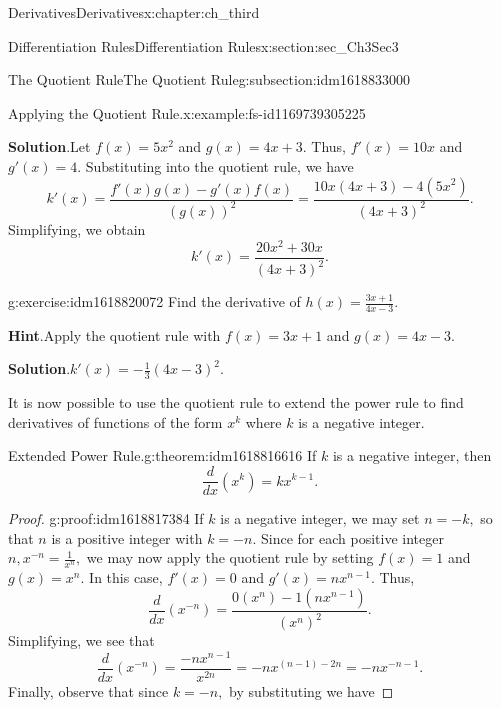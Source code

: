 \documentclass[oneside,10pt,]{book}
\newcommand{\blocktitlefont}{\relax}
\numberwithin{equation}{section}
\begin{document}
\begin{chapterptx}{Derivatives}{}{Derivatives}{}{}{x:chapter:ch_third}
\begin{sectionptx}{Differentiation Rules}{}{Differentiation Rules}{}{}{x:section:sec_Ch3Sec3}
\begin{subsectionptx}{The Quotient Rule}{}{The Quotient Rule}{}{}{g:subsection:idm1618833000}
\begin{example}{Applying the Quotient Rule.}{x:example:fs-id1169739305225}
\par\smallskip%
\noindent\textbf{\blocktitlefont Solution}.\hypertarget{g:solution:idm1618827368}{}\quad{}Let \(f(x)=5x^2\) and \(g(x)=4x+3.\) Thus, \(f'(x)=10x\) and \(g'(x)=4.\) Substituting into the quotient rule, we have%
%
\begin{equation*}
k'(x)=\frac{f'(x)g(x)-g'(x)f(x)}{(g(x))^2}=\frac{10x(4x+3)-4(5x^2)}{(4x+3)^2}.
\end{equation*}
Simplifying, we obtain%
%
\begin{equation*}
k'(x)=\frac{20x^2+30x}{(4x+3)^2}.
\end{equation*}
\end{example}
\begin{inlineexercise}{}{g:exercise:idm1618820072}%
Find the derivative of \(h(x)=\frac{3x+1}{4x-3}.\)%
\par\smallskip%
\noindent\textbf{\blocktitlefont Hint}.\hypertarget{g:hint:idm1618819688}{}\quad{}Apply the quotient rule with \(f(x)=3x+1\) and \(g(x)=4x-3.\)%
\par\smallskip%
\noindent\textbf{\blocktitlefont Solution}.\hypertarget{g:solution:idm1618821352}{}\quad{}\(k'(x)=-\frac{1}{3}{(4x-3)^2}.\)%
\end{inlineexercise}%
It is now possible to use the quotient rule to extend the power rule to find derivatives of functions of the form \(x^k\) where \(k\) is a negative integer.%
\begin{theorem}{Extended Power Rule.}{}{g:theorem:idm1618816616}%
If \(k\) is a negative integer, then%
%
\begin{equation*}
\frac{d}{dx}(x^k)=kx^{k-1} .
\end{equation*}
\end{theorem}
\begin{proof}{}{g:proof:idm1618817384}
If \(k\) is a negative integer, we may set \(n=-k,\) so that \(n\) is a positive integer with \(k=-n.\) Since for each positive integer \(n,x^{-n}=\frac{1}{x^n},\) we may now apply the quotient rule by setting \(f(x)=1\) and \(g(x)=x^n.\) In this case, \(f'(x)=0\) and \(g'(x)=nx^{n-1}.\) Thus,%
%
\begin{equation*}
\frac{d}{dx}(x^{-n})=\frac{0(x^n)-1(nx^{n-1})}{(x^n)^2}.
\end{equation*}
Simplifying, we see that%
%
\begin{equation*}
\frac{d}{dx}(x^{-n})=\frac{-nx^{n-1}}{x^{2n}}=-nx^{(n-1)-2n}=-nx^{-n-1}.
\end{equation*}
Finally, observe that since \(k=-n,\) by substituting we have%

\end{proof}
\end{subsectionptx}
\end{sectionptx}
\end{chapterptx}
\end{document}
